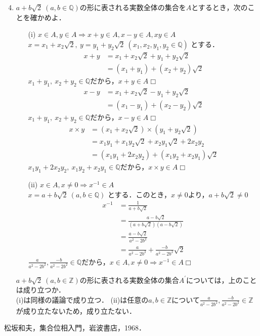 \documentclass[a4j]{jsarticle}
\def \QED{\hfill $\Box$}%
\begin{document}
\begin{enumerate}
	\setcounter{enumi}{3}
	\item $a+b\sqrt{2}\ (a,b \in \mathbb{Q})$の形に表される実数全体の集合を$A$とするとき，次のことを確かめよ．
	\begin{itemize}
		\item[(i)] $x \in A, y \in A \Rightarrow x + y \in A, x - y \in A, xy \in A$\mbox{}\\
		$x = x_{1}+x_{2}\sqrt{2},\ y = y_{1}+y_{2}\sqrt{2}\ (x_{1}, x_{2}, y_{1}, y_{2} \in \mathbb{Q})$ とする．
		\begin{align}
			x + y &= x_{1}+x_{2}\sqrt{2}+ y_{1}+y_{2}\sqrt{2}\\
				  &= (x_{1}+y_{1})+(x_{2}+y_{2})\sqrt{2}
		\end{align}
		$x_{1}+y_{1},\ x_{2}+y_{2}\in \mathbb{Q}$だから，$x+y \in A$\QED
		\begin{align}
			x - y &= x_{1}+x_{2}\sqrt{2}- y_{1}+y_{2}\sqrt{2}\\
				  &= (x_{1}-y_{1})+(x_{2}-y_{2})\sqrt{2}
		\end{align}
		$x_{1}+y_{1},\ x_{2}+y_{2}\in \mathbb{Q}$だから，$x-y \in A$\QED
		\begin{align}
			x \times y &= (x_{1}+x_{2}\sqrt{2}) \times (y_{1}+y_{2}\sqrt{2})\\
					   &= x_{1}y_{1} + x_{1}y_{2}\sqrt{2} + x_{2}y_{1}\sqrt{2} + 2x_{2}y_{2}\\
					   &= (x_{1}y_{1} + 2x_{2}y_{2}) + (x_{1}y_{2} + x_{2}y_{1})\sqrt{2}
		\end{align}
		$x_{1}y_{1} + 2x_{2}y_{2},\ x_{1}y_{2} + x_{2}y_{1} \in \mathbb{Q}$だから，$x \times y \in A$\QED
		\item[(ii)] $x \in A, x \neq 0 \Rightarrow x^{-1} \in A$ \mbox{}\\
		$x = a+b\sqrt{2}\ (a,b \in \mathbb{Q})$ とする．このとき，$x \neq 0$より，$a + b\sqrt{2} \neq 0$
		\begin{align}
			x^{-1} &= \frac{1}{a+b\sqrt{2}}\\
				   &= \frac{a-b\sqrt{2}}{(a+b\sqrt{2})(a-b\sqrt{2})}\\
				   &= \frac{a-b\sqrt{2}}{a^2-2b^2}\\
				   &= \frac{a}{a^2-2b^2} + \frac{-b}{a^2-2b^2}\sqrt{2}
		\end{align}
		$\frac{a}{a^2-2b^2}, \frac{-b}{a^2-2b^2} \in \mathbb{Q}$だから，$x \in A, x \neq 0 \Rightarrow x^{-1} \in A$\QED
		\medskip
	\end{itemize}
	\item[] $a+b\sqrt{2}\ (a,b \in \mathbb{Z})$の形に表される実数全体の集合$A^{\prime}$については，上のことは成り立つか．\mbox{}\\
	(i)は同様の議論で成り立つ．
	(ii)は任意の$a,b \in \mathbb{Z}$について$\frac{a}{a^2-2b^2}, \frac{-b}{a^2-2b^2} \in \mathbb{Z}$が成り立たないため，成り立たない．
\end{enumerate}


\begin{thebibliography}{99}
松坂和夫，集合位相入門，岩波書店，1968．
\end{thebibliography}
\end{document}
